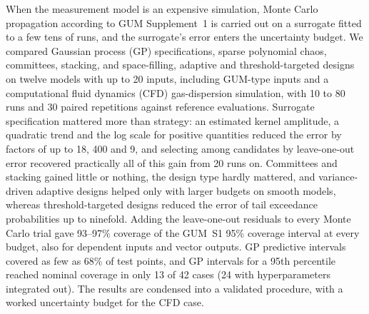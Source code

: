 When the measurement model is an expensive simulation, Monte Carlo
propagation according to GUM Supplement~1 is carried out on a surrogate
fitted to a few tens of runs, and the surrogate's error enters the
uncertainty budget. We compared Gaussian process (GP) specifications,
sparse polynomial chaos, committees, stacking, and space-filling, adaptive
and threshold-targeted designs on twelve models with up to 20 inputs,
including GUM-type inputs and a computational fluid dynamics
(CFD) gas-dispersion simulation, with 10 to 80 runs and 30 paired
repetitions against reference evaluations. Surrogate specification
mattered more than strategy: an estimated kernel amplitude, a
quadratic trend and the log scale for positive quantities reduced the error
by factors of up to 18, 400 and 9, and selecting among candidates by
leave-one-out error recovered practically all of this gain from 20 runs
on. Committees and
stacking gained little or nothing, the design type hardly mattered, and
variance-driven adaptive designs helped only with larger budgets on smooth
models, whereas threshold-targeted designs reduced the error of tail
exceedance probabilities up to ninefold. Adding the leave-one-out residuals to every
Monte Carlo trial gave 93--97\% coverage of the GUM~S1 95\% coverage
interval at every budget, also for dependent inputs and vector outputs.
GP predictive intervals covered as few as 68\% of test points, and GP
intervals for a 95th percentile reached nominal coverage in only 13 of 42
cases (24 with hyperparameters integrated out). The results are
condensed into a validated procedure, with a worked uncertainty budget for
the CFD case.
